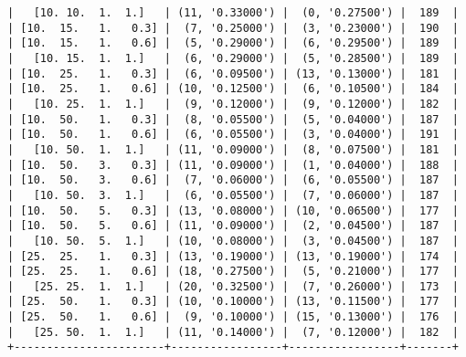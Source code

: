 \documentclass{article}
\begin{document}
\begin{verbatim}
|   [10. 10.  1.  1.]   | (11, '0.33000') |  (0, '0.27500') |  189  |
| [10.  15.   1.   0.3] |  (7, '0.25000') |  (3, '0.23000') |  190  |
| [10.  15.   1.   0.6] |  (5, '0.29000') |  (6, '0.29500') |  189  |
|   [10. 15.  1.  1.]   |  (6, '0.29000') |  (5, '0.28500') |  189  |
| [10.  25.   1.   0.3] |  (6, '0.09500') | (13, '0.13000') |  181  |
| [10.  25.   1.   0.6] | (10, '0.12500') |  (6, '0.10500') |  184  |
|   [10. 25.  1.  1.]   |  (9, '0.12000') |  (9, '0.12000') |  182  |
| [10.  50.   1.   0.3] |  (8, '0.05500') |  (5, '0.04000') |  187  |
| [10.  50.   1.   0.6] |  (6, '0.05500') |  (3, '0.04000') |  191  |
|   [10. 50.  1.  1.]   | (11, '0.09000') |  (8, '0.07500') |  181  |
| [10.  50.   3.   0.3] | (11, '0.09000') |  (1, '0.04000') |  188  |
| [10.  50.   3.   0.6] |  (7, '0.06000') |  (6, '0.05500') |  187  |
|   [10. 50.  3.  1.]   |  (6, '0.05500') |  (7, '0.06000') |  187  |
| [10.  50.   5.   0.3] | (13, '0.08000') | (10, '0.06500') |  177  |
| [10.  50.   5.   0.6] | (11, '0.09000') |  (2, '0.04500') |  187  |
|   [10. 50.  5.  1.]   | (10, '0.08000') |  (3, '0.04500') |  187  |
| [25.  25.   1.   0.3] | (13, '0.19000') | (13, '0.19000') |  174  |
| [25.  25.   1.   0.6] | (18, '0.27500') |  (5, '0.21000') |  177  |
|   [25. 25.  1.  1.]   | (20, '0.32500') |  (7, '0.26000') |  173  |
| [25.  50.   1.   0.3] | (10, '0.10000') | (13, '0.11500') |  177  |
| [25.  50.   1.   0.6] |  (9, '0.10000') | (15, '0.13000') |  176  |
|   [25. 50.  1.  1.]   | (11, '0.14000') |  (7, '0.12000') |  182  |
+-----------------------+-----------------+-----------------+-------+
\end{verbatim}
\end{document}
